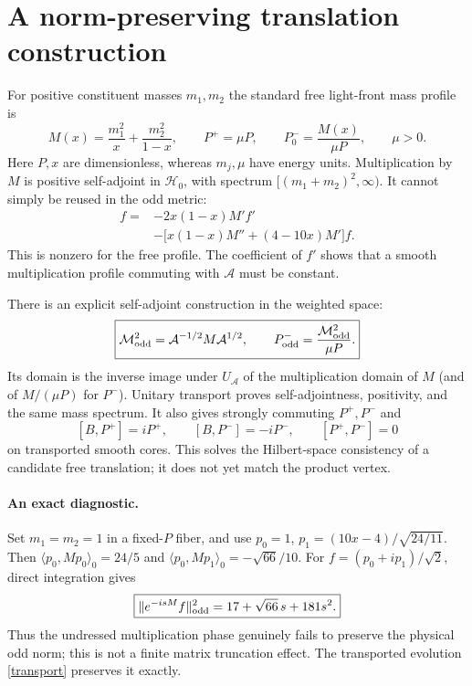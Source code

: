 \documentclass[11pt,a4paper]{article}
\newcommand{\Aop}{\mathcal A}
\newcommand{\HH}{\mathcal H}
\newcommand{\MM}{\mathcal M^2}
\begin{document}
\newpage
\section{A norm-preserving translation construction}
For positive constituent masses $m_1,m_2$ the standard free light-front
mass profile \cite{Pauli} is
\begin{equation}
 M(x)=\frac{m_1^2}{x}+\frac{m_2^2}{1-x},\qquad
 P^+=\mu P,\qquad P^-_0=\frac{M(x)}{\mu P},\qquad \mu>0.
\end{equation}
Here $P,x$ are dimensionless, whereas $m_j,\mu$ have energy units.
Multiplication by $M$ is positive self-adjoint in $\HH_0$, with spectrum
$[(m_1+m_2)^2,\infty)$. It cannot simply be reused in the odd metric:
\begin{align}
 [\Aop,M]f={}&-2x(1-x)M'f'\nonumber\\
 &-\bigl[x(1-x)M''+(4-10x)M'\bigr]f.\label{defect}
\end{align}
This is nonzero for the free profile. The coefficient of $f'$ shows
that a smooth multiplication profile commuting with $\Aop$ must be constant.

There is an explicit self-adjoint construction in the weighted space:
\begin{equation}
 \boxed{\MM_{\rm odd}=\Aop^{-1/2}M\Aop^{1/2},\qquad
        P^-_{\rm odd}=\frac{\MM_{\rm odd}}{\mu P}.}\label{transport}
\end{equation}
Its domain is the inverse image under $U_{\Aop}$ of the multiplication
domain of $M$ (and of $M/(\mu P)$ for $P^-$). Unitary transport proves
self-adjointness, positivity, and the same mass spectrum. It also gives
strongly commuting $P^+,P^-$ and
\[
 [B,P^+]=iP^+,\qquad [B,P^-]=-iP^-,\qquad [P^+,P^-]=0
\]
on transported smooth cores. This solves the Hilbert-space consistency
of a candidate free translation; it does not yet match the product vertex.

\paragraph{An exact diagnostic.}
Set $m_1=m_2=1$ in a fixed-$P$ fiber, and use
$p_0=1$, $p_1=(10x-4)/\sqrt{24/11}$.
Then $\langle p_0,Mp_0\rangle_0=24/5$ and
$\langle p_0,Mp_1\rangle_0=-\sqrt{66}/10$.
For $f=(p_0+ip_1)/\sqrt2$, direct integration gives
\begin{equation}
 \boxed{\|e^{-isM}f\|_{\rm odd}^2=17+\sqrt{66}\,s+181s^2.}\label{norm}
\end{equation}
Thus the undressed multiplication phase genuinely fails to preserve
the physical odd norm; this is not a finite matrix truncation effect.
The transported evolution \eqref{transport} preserves it exactly.
\end{document}
